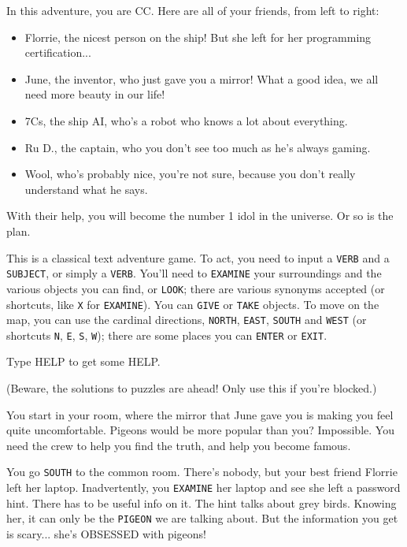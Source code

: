 \documentclass{article}
\newcommand{\bckg}[1]{\AddToShipoutPictureBG*{\texttt{[image: \#1]}}}
\begin{document}
In this adventure, you are CC.
Here are all of your friends, from left to right:
\begin{itemize}
    \item Florrie, the nicest person on the ship! But she left for her programming certification...
    \item June, the inventor, who just gave you a mirror! What a good idea, we all need more beauty in our life!
    \item 7Cs, the ship AI, who's a robot who knows a lot about everything.
    \item Ru D., the captain, who you don't see too much as he's always gaming.
    \item Wool, who's probably nice, you're not sure, because you don't really understand what he says.
\end{itemize}

With their help, you will become the number 1 idol in the universe. Or so is the plan.

\clearpage
{}
\bckg{img/bg}

This is a classical text adventure game.
To act, you need to input a \texttt{VERB} and a \texttt{SUBJECT}, or simply a \texttt{VERB}.
You'll need to \texttt{EXAMINE} your surroundings and the various objects you can find,
or \texttt{LOOK}; there are various synonyms accepted (or shortcuts, like \texttt{X} for \texttt{EXAMINE}).
You can \texttt{GIVE} or \texttt{TAKE} objects.
To move on the map, you can use the cardinal directions, \texttt{NORTH}, \texttt{EAST},
\texttt{SOUTH} and \texttt{WEST} (or shortcuts \texttt{N}, \texttt{E}, \texttt{S}, \texttt{W});
there are some places you can \texttt{ENTER} or \texttt{EXIT}.

Type HELP to get some HELP.

\clearpage

\clearpage
{}
\bckg{img/bg}

(Beware, the solutions to puzzles are ahead! Only use this if you're blocked.)

You start in your room, where the mirror that June gave you is making you feel quite uncomfortable.
Pigeons would be more popular than you? Impossible.
You need the crew to help you find the truth, and help you become famous.

You go \texttt{SOUTH} to the common room.
There's nobody, but your best friend Florrie left her laptop.
Inadvertently, you \texttt{EXAMINE} her laptop and see she left a password hint.
There has to be useful info on it. The hint talks about grey birds.
Knowing her, it can only be the \texttt{PIGEON} we are talking about.
But the information you get is scary... she's OBSESSED with pigeons!
\end{document}
